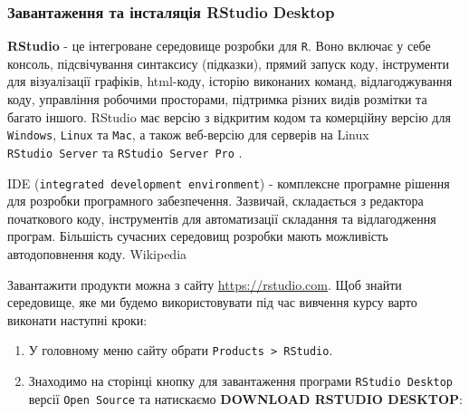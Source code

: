 \documentclass[
]{book}
\providecommand{\tightlist}{%
  \setlength{\itemsep}{0pt}\setlength{\parskip}{0pt}}
\begin{document}
\hypertarget{chapter1321}{%
\subsubsection{Завантаження та інсталяція RStudio Desktop}\label{chapter1321}}

\textbf{RStudio} - це інтегроване середовище розробки для \texttt{R}. Воно включає у себе консоль, підсвічування синтаксису (підказки), прямий запуск коду, інструменти для візуалізації графіків, html-коду, історію виконаних команд, відлагоджування коду, управління робочими просторами, підтримка різних видів розмітки та багато іншого. RStudio має версію з відкритим кодом та комерційну версію для \texttt{Windows}, \texttt{Linux} та \texttt{Mac}, а також веб-версію для серверів на Linux \texttt{RStudio\ Server} та \texttt{RStudio\ Server\ Pro} \citep{R-studio-site}.

IDE (\texttt{integrated\ development\ environment}) - комплексне програмне рішення для розробки програмного забезпечення. Зазвичай, складається з редактора початкового коду, інструментів для автоматизації складання та відлагодження програм. Більшість сучасних середовищ розробки мають можливість автодоповнення коду. Wikipedia

Завантажити продукти можна з сайту \url{https://rstudio.com}. Щоб знайти середовище, яке ми будемо використовувати під час вивчення курсу варто виконати наступні кроки:

\begin{enumerate}
\def\labelenumi{\arabic{enumi}.}
\tightlist
\item
  У головному меню сайту обрати \texttt{Products\ \textgreater{}\ RStudio}.
\item
  Знаходимо на сторінці кнопку для завантаження програми \texttt{RStudio\ Desktop} версії \texttt{Open\ Source} та натискаємо \textbf{DOWNLOAD RSTUDIO DESKTOP}:
\end{enumerate}
\end{document}

